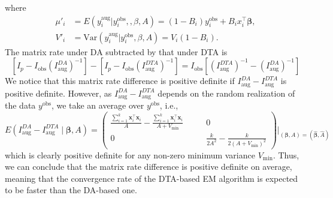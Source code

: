 \documentclass[12pt]{article}
\begin{document}
where 
\begin{align}
\mu'_i&=E(y_i^{\textrm{aug}}\vert y_i^{\textrm{obs}}, , \beta, A)=(1-B_i) y^{\textrm{obs}}_i+B_ix^\top_i\boldsymbol{\beta}\nonumber,\\
V'_i&=\textrm{Var}(y_i^{\textrm{aug}}\vert y_i^{\textrm{obs}}, \beta, A)=V_i(1-B_i).\nonumber
\end{align}
The matrix rate under DA subtracted by that under DTA is 
$$
[I_p - I_{\textrm{obs}}(I^{DA}_{\textrm{aug}})^{-1}]-[I_p - I_{\textrm{obs}}(I^{DTA}_{\textrm{aug}})^{-1}]=I_{\textrm{obs}}[(I^{DTA}_{\textrm{aug}})^{-1}-(I^{DA}_{\textrm{aug}})^{-1}]
$$
We notice that this matrix rate difference is positive definite if $I^{DA}_{\textrm{aug}}-I^{DTA}_{\textrm{aug}}$ is positive definite. However, as $I^{DA}_{\textrm{aug}}-I^{DTA}_{\textrm{aug}}$  depends on the random realization of the data $y^{\textrm{obs}}$, we take an average over $y^{\textrm{obs}}$, i.e.,
$$
E\!\left(I^{DA}_{\textrm{aug}}-I^{DTA}_{\textrm{aug}}\mid \boldsymbol{\beta}, A\right)=\left( \begin{array}{ccc}
\frac{\sum_{i=1}^k\boldsymbol{x}^{\top}_i\boldsymbol{x}_i}{A} -\frac{\sum_{i=1}^k\boldsymbol{x}^{\top}_i\boldsymbol{x}_i}{A+V_{\textrm{min}}}  &~~~~~&0 \\
0& &\frac{k}{2A^2}-\frac{k}{2(A+V_{\textrm{min}})^2}\end{array} \right)\bigg\vert_{(\boldsymbol{\beta}, A)=(\hat{\boldsymbol{\beta}}, \hat{A})}
$$
which is clearly positive definite for any non-zero minimum variance $V_{\textrm{min}}$. Thus, we can conclude that the matrix rate difference is positive definite on average, meaning that the convergence rate of the DTA-based EM algorithm is expected to be faster than the DA-based one.
\end{document}

